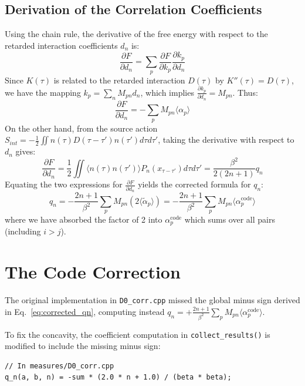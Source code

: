 \documentclass{article}
\begin{document}
\subsection{Derivation of the Correlation Coefficients}
Using the chain rule, the derivative of the free energy with respect to the retarded interaction coefficients $d_n$ is:
\begin{equation}
\frac{\partial F}{\partial d_n} = \sum_p \frac{\partial F}{\partial k_p} \frac{\partial k_p}{\partial d_n}
\end{equation}
Since $K(\tau)$ is related to the retarded interaction $D(\tau)$ by $K''(\tau) = D(\tau)$, we have the mapping $k_p = \sum_n M_{pn} d_n$, which implies $\frac{\partial k_p}{\partial d_n} = M_{pn}$. Thus:
\begin{equation}
\frac{\partial F}{\partial d_n} = -\sum_p M_{pn} \langle \alpha_p \rangle
\end{equation}
On the other hand, from the source action $S_{int} = -\frac{1}{2} \iint n(\tau) D(\tau-\tau') n(\tau') d\tau d\tau'$, taking the derivative with respect to $d_n$ gives:
\begin{equation}
\frac{\partial F}{\partial d_n} = \frac{1}{2} \iint \langle n(\tau) n(\tau') \rangle P_n(x_{\tau - \tau'}) d\tau d\tau' = \frac{\beta^2}{2(2n+1)} q_n
\end{equation}
Equating the two expressions for $\frac{\partial F}{\partial d_n}$ yields the corrected formula for $q_n$:
\begin{equation}
q_n = - \frac{2n+1}{\beta^2} \sum_p M_{pn} (2\langle \tilde{\alpha}_p \rangle) = - \frac{2n+1}{\beta^2} \sum_p M_{pn} \langle \alpha_p^{\text{code}} \rangle \label{eq:corrected_qn}
\end{equation}
where we have absorbed the factor of 2 into $\alpha_p^{\text{code}}$ which sums over all pairs (including $i > j$).

\section{The Code Correction}
The original implementation in \texttt{D0\_corr.cpp} missed the global minus sign derived in Eq.~\eqref{eq:corrected_qn}, computing instead $q_n = + \frac{2n+1}{\beta^2} \sum_p M_{pn} \langle \alpha_p^{\text{code}} \rangle$. 

To fix the concavity, the coefficient computation in \texttt{collect\_results()} is modified to include the missing minus sign:
\begin{verbatim}
// In measures/D0_corr.cpp
q_n(a, b, n) = -sum * (2.0 * n + 1.0) / (beta * beta);
\end{verbatim}
\end{document}

